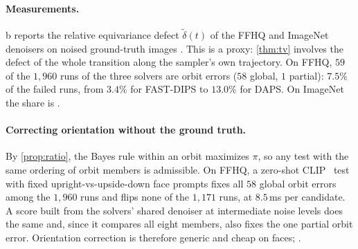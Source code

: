 \paragraph{Measurements.}
b reports the relative equivariance defect $\tilde\delta(t)$ of the FFHQ and ImageNet denoisers on noised ground-truth images .
This is a proxy: \cref{thm:tv} involves the defect of the whole transition along the sampler's own trajectory.
On FFHQ, $59$ of the $1{,}960$ runs of the three solvers are orbit errors ($58$ global, $1$ partial): $7.5\%$ of the failed runs, from $3.4\%$ for FAST-DIPS to $13.0\%$ for DAPS.
On ImageNet the share is .

\paragraph{Correcting orientation without the ground truth.}
By \cref{prop:ratio}, the Bayes rule within an orbit maximizes $\pi$, so any test with the same ordering of orbit members is admissible.
On FFHQ, a zero-shot CLIP~\cite{radford2021clip} test with fixed upright-vs-upside-down face prompts  fixes all $58$ global orbit errors among the $1{,}960$ runs and flips none of the $1{,}171$ \good runs, at $8.5$\,ms per candidate.
A score built from the solvers' shared denoiser at intermediate noise levels does the same and, since it compares all eight members, also fixes the one partial orbit error.
Orientation correction is therefore generic and cheap on faces; .
